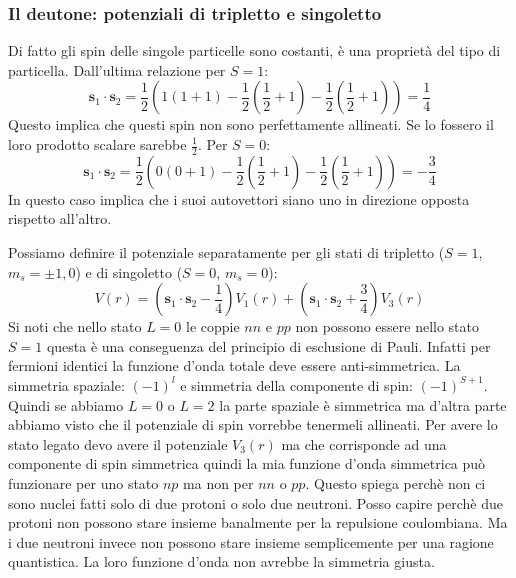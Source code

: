 \subsubsection{Il deutone: potenziali di tripletto e singoletto}
Di fatto gli spin delle singole particelle sono costanti, è una proprietà del tipo di particella. Dall'ultima relazione per $S=1$:
\begin{equation*}
\mathbf{s}_1\cdot\mathbf{s}_2=\frac{1}{2}(1(1+1)-\frac{1}{2}(\frac{1}{2}+1)-\frac{1}{2}(\frac{1}{2}+1))=\frac{1}{4}
\end{equation*}
Questo implica che questi spin non sono perfettamente allineati. Se lo fossero il loro prodotto scalare sarebbe $\frac{1}{2}$. Per $S=0$:
\begin{equation*}
    \mathbf{s}_1\cdot\mathbf{s}_2=\frac{1}{2}(0(0+1)-\frac{1}{2}(\frac{1}{2}+1)-\frac{1}{2}(\frac{1}{2}+1))=-\frac{3}{4}
\end{equation*}
In questo caso implica che i suoi autovettori siano uno in direzione opposta rispetto all'altro.

Possiamo definire il potenziale separatamente per gli stati di tripletto ($S=1$, $m_s=\pm1,0$) e di singoletto ($S=0$, $m_s=0$):
\begin{equation*}
    V(r)=\left(\mathbf{s}_1\cdot\mathbf{s}_2-\frac{1}{4}\right)V_1(r)+\left(\mathbf{s}_1\cdot\mathbf{s}_2+\frac{3}{4}\right)V_3(r)
\end{equation*}
Si noti che nello stato $L=0$ le coppie $nn$ e $pp$ non possono essere nello stato $S=1$ questa è una conseguenza del principio di esclusione di Pauli. Infatti per fermioni identici la funzione d'onda totale deve essere anti-simmetrica. La simmetria spaziale: $(-1)^l$ e simmetria della componente di spin: $(-1)^{S+1}$. Quindi se abbiamo $L=0$ o $L=2$ la parte spaziale è simmetrica ma d'altra parte abbiamo visto che il potenziale di spin vorrebbe tenermeli allineati. Per avere lo stato legato devo avere il potenziale $V_3(r)$ ma che corrisponde ad una componente di spin simmetrica quindi la mia funzione d'onda simmetrica può funzionare per uno stato $np$ ma non per $nn$ o $pp$. Questo spiega perchè non ci sono nuclei fatti solo di due protoni o solo due neutroni. Posso capire perchè due protoni non possono stare insieme banalmente per la repulsione coulombiana. Ma i due neutroni invece non possono stare insieme semplicemente per una ragione quantistica. La loro funzione d'onda non avrebbe la simmetria giusta.

